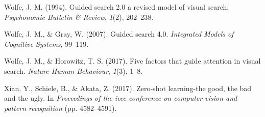 \documentclass[
  english,
  man]{apa6}
\begin{document}
\leavevmode\hypertarget{ref-wolfe1994guided}{}%
Wolfe, J. M. (1994). Guided search 2.0 a revised model of visual search. \emph{Psychonomic Bulletin \& Review}, \emph{1}(2), 202--238.

\leavevmode\hypertarget{ref-wolfe2007guided}{}%
Wolfe, J. M., \& Gray, W. (2007). Guided search 4.0. \emph{Integrated Models of Cognitive Systems}, 99--119.

\leavevmode\hypertarget{ref-wolfe2017five}{}%
Wolfe, J. M., \& Horowitz, T. S. (2017). Five factors that guide attention in visual search. \emph{Nature Human Behaviour}, \emph{1}(3), 1--8.

\leavevmode\hypertarget{ref-xian2017zero}{}%
Xian, Y., Schiele, B., \& Akata, Z. (2017). Zero-shot learning-the good, the bad and the ugly. In \emph{Proceedings of the ieee conference on computer vision and pattern recognition} (pp. 4582--4591).

\endgroup
\end{document}
